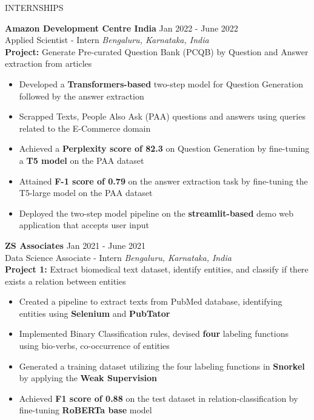 \documentclass{resume} %
\begin{document}
\begin{rSection}{INTERNSHIPS}

\textbf{Amazon Development Centre India} \hfill Jan 2022 - June 2022\\
Applied Scientist - Intern \hfill \textit{Bengaluru, Karnataka, India}
{\\ {\bf Project:} Generate Pre-curated Question Bank (PCQB) by Question and Answer extraction from articles}
 \begin{itemize}
    \itemsep -3pt {} 
     \item Developed a {\bf Transformers-based} two-step model for Question Generation followed by the answer extraction
     \item Scrapped Texts, People Also Ask (PAA) questions and answers using queries related to the E-Commerce domain
    \item Achieved a {\bf Perplexity score of 82.3} on Question Generation by fine-tuning a {\bf T5 model} on the PAA dataset
    \item Attained {\bf F-1 score of 0.79} on the answer extraction task by fine-tuning the T5-large model on the PAA dataset
    \item Deployed the two-step model pipeline on the {\bf streamlit-based} demo web application that accepts user input
 \end{itemize}

\textbf{ZS Associates} \hfill Jan 2021 - June 2021\\
Data Science Associate - Intern \hfill \textit{Bengaluru, Karnataka, India}
{\\ {\bf Project 1:} Extract biomedical text dataset, identify entities, and classify if there exists a relation between entities}
 \begin{itemize}
    \itemsep -3pt {} 
     \item Created a pipeline to extract texts from PubMed database, identifying entities using \textbf{Selenium} and \textbf{PubTator}
     \item Implemented Binary Classification rules, devised \textbf{four} labeling functions using bio-verbs, co-occurrence of entities
    \item Generated a training dataset utilizing the four labeling functions in \textbf{Snorkel} by applying the \textbf{Weak Supervision}
    \item Achieved \textbf{F1 score of 0.88} on the test dataset in relation-classification by fine-tuning \textbf{RoBERTa base} model
 \end{itemize}


\end{rSection}
\end{document}
